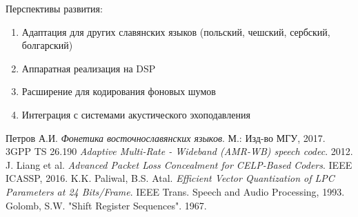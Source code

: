 \documentclass{report}
\begin{document}
	Перспективы развития:
	\begin{enumerate}
		\item Адаптация для других славянских языков (польский, чешский, сербский, болгарский)
		\item Аппаратная реализация на DSP
		\item Расширение для кодирования фоновых шумов
		\item Интеграция с системами акустического эхоподавления
	\end{enumerate}
	
	\begin{thebibliography}{9}
		 Петров А.И. \emph{Фонетика восточнославянских языков}. М.: Изд-во МГУ, 2017.
		 3GPP TS 26.190 \emph{Adaptive Multi-Rate - Wideband (AMR-WB) speech codec}. 2012.
		 J. Liang et al. \emph{Advanced Packet Loss Concealment for CELP-Based Coders}. IEEE ICASSP, 2016.
		 K.K. Paliwal, B.S. Atal. \emph{Efficient Vector Quantization of LPC Parameters at 24 Bits/Frame}. IEEE Trans. Speech and Audio Processing, 1993.
		 Golomb, S.W. "Shift Register Sequences". 1967.
	\end{thebibliography}
	
\end{document}
